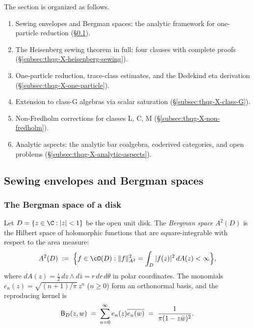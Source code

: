 The section is organized as follows.
\begin{enumerate}[label=\textup{(\arabic*)}]
\item Sewing envelopes and Bergman spaces:
 the analytic framework for one-particle reduction
 (\S\ref{subsec:thqg-X-sewing-bergman}).
\item The Heisenberg sewing theorem in full:
 four clauses with complete proofs
 (\S\ref{subsec:thqg-X-heisenberg-sewing}).
\item One-particle reduction, trace-class estimates,
 and the Dedekind eta derivation
 (\S\ref{subsec:thqg-X-one-particle}).
\item Extension to class-G algebras via scalar saturation
 (\S\ref{subsec:thqg-X-class-G}).
\item Non-Fredholm corrections for classes L, C, M
 (\S\ref{subsec:thqg-X-non-fredholm}).
\item Analytic aspects: the analytic bar coalgebra,
 coderived categories, and open problems
 (\S\ref{subsec:thqg-X-analytic-aspects}).
\end{enumerate}

%
%

\subsection{Sewing envelopes and Bergman spaces}
\label{subsec:thqg-X-sewing-bergman}

\subsubsection{The Bergman space of a disk}

\begin{definition}%
\label{def:thqg-X-bergman-space}%
%
Let $D = \{z \in \C : |z| < 1\}$ be the open unit disk.
The \emph{Bergman space} $A^2(D)$ is the Hilbert space of
holomorphic functions that are square-integrable with respect
to the area measure:
\begin{equation}\label{eq:thqg-X-bergman-norm}
A^2(D)
\;:=\;
\Bigl\{f \in \cO(D) : \|f\|^2_{A^2}
= \int_D |f(z)|^2\,dA(z) < \infty\Bigr\},
\end{equation}
where $dA(z) = \frac{i}{2}\,dz \wedge d\bar{z}
= r\,dr\,d\theta$ in polar coordinates. The monomials
$e_n(z) = \sqrt{(n+1)/\pi}\, z^n$ ($n \geq 0$)
form an orthonormal basis, and the reproducing kernel is
\begin{equation}\label{eq:thqg-X-bergman-kernel}
\mathsf{B}_D(z,w)
\;=\;
\sum_{n=0}^{\infty} e_n(z)\overline{e_n(w)}
\;=\;
\frac{1}{\pi(1 - z\bar{w})^2}.
\end{equation}
\end{definition}

